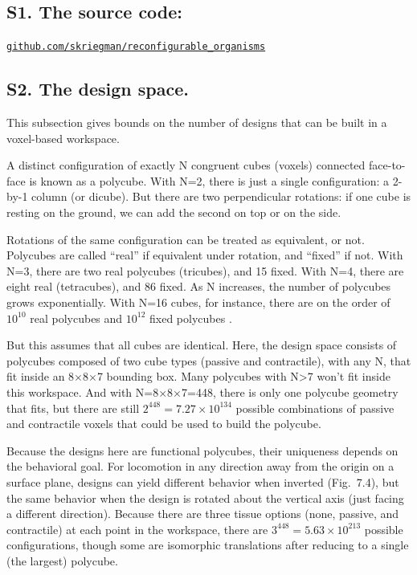 \subsection*{S1. The source code:}  


\href{https://github.com/skriegman/reconfigurable_organisms}{\tt\color{blue}github.com/skriegman/reconfigurable\_organisms}


\subsection*{S2. The design space.}

This subsection gives bounds on the number of designs that can be built in a voxel-based workspace.

A distinct configuration of exactly N congruent cubes (voxels) connected face-to-face is known as a polycube. With N=2, there is just a single configuration: a 2-by-1 column (or dicube). But there are two perpendicular rotations: if one cube is resting on the ground, we can add the second on top or on the side. 

Rotations of the same configuration can be treated as equivalent, or not. Polycubes are called ``real'' if equivalent under rotation, and ``fixed'' if not. With N=3, there are two real polycubes (tricubes), and 15 fixed. With N=4, there are eight real (tetracubes), and 86 fixed. As N increases, the number of polycubes grows exponentially. With N=16 cubes, for instance, there are on the order of $10^{10}$ real polycubes and $10^{12}$ fixed polycubes \cite{polycubes}. 

But this assumes that all cubes are identical. Here, the design space consists of polycubes composed of two cube types (passive and contractile), with any N, that fit inside an 8{$\times$}8{$\times$}7 bounding box. Many polycubes with N>7 won't fit inside this workspace. And with N=8{$\times$}8{$\times$}7=448, there is only one polycube geometry that fits, but there are still $2^{448} = 7.27\times10^{134}$ possible combinations of passive and contractile voxels that could be used to build the polycube.

Because the designs here are functional polycubes, their uniqueness depends on the behavioral goal. For locomotion in any direction away from the origin on a surface plane, designs can yield different behavior when inverted (Fig.~7.4), but the same behavior when the design is rotated about the vertical axis (just facing a different direction). Because there are three tissue options (none, passive, and contractile) at each point in the workspace, there are 
$3^{448} = 5.63\times10^{213}$ possible configurations, though some are isomorphic translations after reducing to a single (the largest) polycube.


